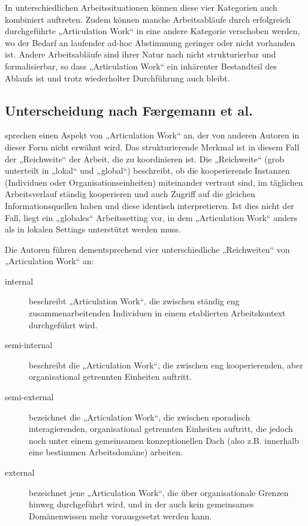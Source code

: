 In unterschiedlichen Arbeitssituationen können diese vier Kategorien auch kombiniert auftreten. Zudem können manche Arbeitsabläufe durch erfolgreich durchgeführte „Articulation Work“ in eine andere Kategorie verschoben werden, wo der Bedarf an laufender ad-hoc Abstimmung geringer oder nicht vorhanden ist. Andere Arbeitsabläufe sind ihrer Natur nach nicht strukturierbar und formalisierbar, so dass „Articulation Work“ ein inhärenter Bestandteil des Ablaufs ist und trotz wiederholter Durchführung auch bleibt.

\subsection{Unterscheidung nach Færgemann et al.} %
\label{sub:unterscheidung_nach_færgemann_et_al_}

\citet{Faergemann05} sprechen einen Aspekt von „Articulation Work“ an, der von anderen Autoren in dieser Form nicht erwähnt wird. Das strukturierende Merkmal ist in diesem Fall der „Reichweite“ der Arbeit, die zu koordinieren ist. Die „Reichweite“ (grob unterteilt in „lokal“ und „global“) beschreibt, ob die kooperierende Instanzen (Individuen oder Organisationseinheiten) miteinander vertraut sind, im täglichen Arbeitsverlauf ständig kooperieren und auch Zugriff auf die gleichen Informationsquellen haben und diese identisch interpretieren. Ist dies nicht der Fall, liegt ein „globales“ Arbeitssetting vor, in dem „Articulation Work“ anders als in lokalen Settings unterstützt werden muss.

Die Autoren führen dementsprechend vier unterschiedliche „Reichweiten“ von „Articulation Work“ an:
\begin{description}
	\item[internal] beschreibt „Articulation Work“, die zwischen ständig eng zusammenarbeitenden Individuen in einem etablierten Arbeitskontext durchgeführt wird.
	\item[semi-internal] beschreibt die „Articulation Work“, die zwischen eng kooperierenden, aber organisational getrennten Einheiten auftritt.
	\item[semi-external] bezeichnet die „Articulation Work“, die zwischen sporadisch interagierenden, organisational getrennten Einheiten auftritt, die jedoch noch unter einem gemeinsamen konzeptionellen Dach (also z.B. innerhalb eine bestimmen Arbeitsdomäne) arbeiten.
	\item[external] bezeichnet jene „Articulation Work“, die über organisationale Grenzen hinweg durchgeführt wird, und in der auch kein gemeinsames Domänenwissen mehr vorausgesetzt werden kann.
\end{description}

